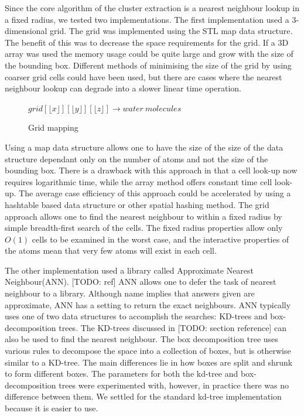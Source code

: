 \documentclass[a4paper,11pt]{report}
\begin{document}
Since the core algorithm of the cluster extraction is a nearest neighbour lookup in a fixed radius, we tested two implementations. The first implementation used a 3-dimensional grid. The grid was implemented using the STL map data structure. The benefit of this was to decrease the space requirements for the grid. If a 3D array was used the memory usage could be quite large and grow with the size of the bounding box. Different methods of minimising the size of the grid by using coarser grid cells could have been used, but there are cases where the nearest neighbour lookup can degrade into a slower linear time operation.

\begin{figure}[!h]
\begin{center}
 \small
 $grid[\lfloor x\rfloor][\lfloor y\rfloor][\lfloor z\rfloor] \rightarrow water\ molecules$
 \caption{Grid mapping}
\end{center} 
\end{figure}

Using a map data structure allows one to have the size of the size of the data structure dependant only on the number of atoms and not the size of the bounding box. There is a drawback with this approach in that a cell look-up now requires logarithmic time, while the array method offers constant time cell look-up. The average case efficiency of this approach could be accelerated by using a hashtable based data structure or other spatial hashing method. The grid approach allows one to find the nearest neighbour to within a fixed radius by simple breadth-first search of the cells. The fixed radius properties allow only $O(1)$ cells to be examined in the worst case, and the interactive properties of the atoms mean that very few atoms will exist in each cell.

The other implementation used a library called Approximate Nearest Neighbour(ANN). [TODO: ref] ANN allows one to defer the task of nearest neighbour to a library. Although name implies that answers given are approximate, ANN has a setting to return the exact neighbours. ANN typically uses one of two data structures to accomplish the searches: KD-trees and box-decomposition trees. The KD-trees discussed in [TODO: section reference] can also be used to find the nearest neighbour. The box decomposition tree uses various rules to decompose the space into a collection of boxes, but is otherwise similar to a KD-tree. The main differences lie in how boxes are split and shrunk to form different boxes. The parameters for both the kd-tree and box-decomposition trees were experimented with, however, in practice there was no difference between them. We settled for the standard kd-tree implementation because it is easier to use.
\end{document}
